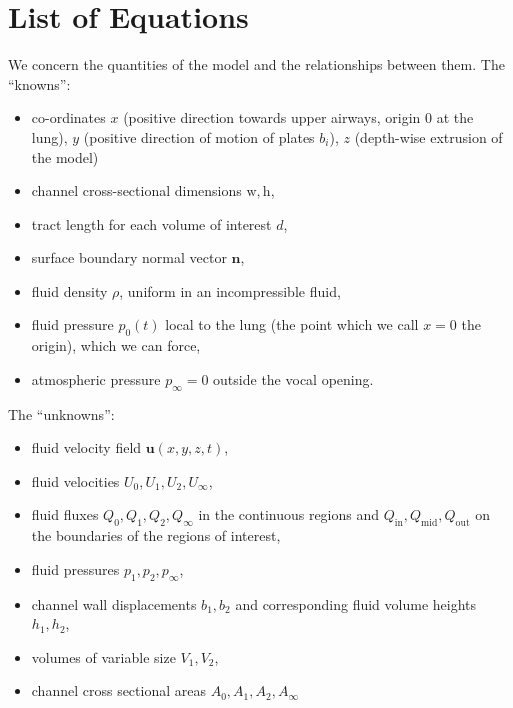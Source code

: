 \documentclass{article}
\begin{document}

\section{List of Equations} %

We concern the quantities of the model and the relationships between them. The ``knowns'':

\begin{itemize}
    \item co-ordinates $x$ (positive direction towards upper airways, origin $0$ at the lung), $y$ (positive direction of motion of plates $b_i$), $z$ (depth-wise extrusion of the model)
    \item channel cross-sectional dimensions $\mathrm{w,h}$,
    \item tract length for each volume of interest $d$,
    \item surface boundary normal vector $\mathbf{n}$,
    \item fluid density $\rho$, uniform in an incompressible fluid,
    \item fluid pressure $p_0(t)$ local to the lung (the point which we call $x=0$ the origin), which we can force,
    \item atmospheric pressure $p_\infty = 0$ outside the vocal opening.
\end{itemize}

The ``unknowns'':

\begin{itemize}
    \item fluid velocity field $\mathbf{u}(x,y,z,t)$, %
    \item fluid velocities $U_0, U_1, U_2, U_\infty$,
    \item fluid fluxes $Q_0, Q_1, Q_2, Q_\infty$ in the continuous regions and $Q_\mathrm{in}, Q_\mathrm{mid}, Q_\mathrm{out}$ on the boundaries of the regions of interest,
    \item fluid pressures $p_1, p_2, p_\infty$,
    \item channel wall displacements $b_1, b_2$ and corresponding fluid volume heights $h_1, h_2$,
    \item volumes of variable size $V_1, V_2$,
    \item channel cross sectional areas $A_0, A_1, A_2, A_\infty$
\end{itemize}
\end{document}
